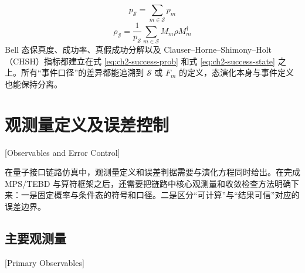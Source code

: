 \begin{equation}
p_{\mathcal S}=\sum_{m\in\mathcal S}p_m
\label{eq:ch2-success-prob}
\end{equation}
\begin{equation}
\rho_{\mathcal S}=
\frac{1}{p_{\mathcal S}}\sum_{m\in\mathcal S}M_m\rho M_m^{\dagger}
\label{eq:ch2-success-state}
\end{equation}
Bell 态保真度、成功率、真假成功分解以及 Clauser--Horne--Shimony--Holt（CHSH）指标都建立在式 \eqref{eq:ch2-success-prob} 和式 \eqref{eq:ch2-success-state} 之上。所有“事件口径”的差异都能追溯到 $\mathcal S$ 或 $F_m$ 的定义，态演化本身与事件定义也能保持分离。

\section{观测量定义及误差控制}[Observables and Error Control]

在量子接口链路仿真中，观测量定义和误差判据需要与演化方程同时给出。在完成 MPS/TEBD 与算符框架之后，还需要把链路中核心观测量和收敛检查方法明确下来：一是固定概率与条件态的符号和口径。二是区分“可计算”与“结果可信”对应的误差边界。

\subsection{主要观测量}[Primary Observables]

